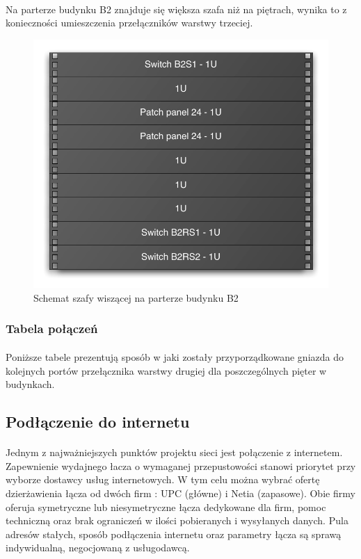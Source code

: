\paragraph{}
Na parterze budynku B2 znajduje się większa szafa niż na piętrach, wynika to z konieczności umieszczenia przełączników warstwy trzeciej.

\begin{figure}[H]
  \begin{center}
    \includegraphics[width=\textwidth]{img/s/szafa-b2.pdf}
    \caption{Schemat szafy wiszącej na parterze budynku B2}
  \end{center}
\end{figure}


\subsubsection{Tabela połączeń}
\paragraph{}
Poniższe tabele prezentują sposób w jaki zostały przyporządkowane gniazda do kolejnych portów przełącznika warstwy drugiej dla poszczególnych pięter w budynkach.


\subsection{Podłączenie do internetu}
\paragraph{}
Jednym z najważniejszych punktów projektu sieci jest połączenie z internetem. Zapewnienie wydajnego łacza o wymaganej przepustowości stanowi priorytet przy wyborze dostawcy usług internetowych. W tym celu można wybrać ofertę dzierżawienia łącza od dwóch firm : UPC (główne) i Netia (zapasowe). Obie firmy oferuja symetryczne lub niesymetryczne łącza dedykowane dla firm, pomoc techniczną oraz brak ograniczeń w ilości pobieranych i wysyłanych danych. Pula adresów stałych, sposób podłączenia internetu oraz parametry łącza są sprawą indywidualną, negocjowaną z usługodawcą.


